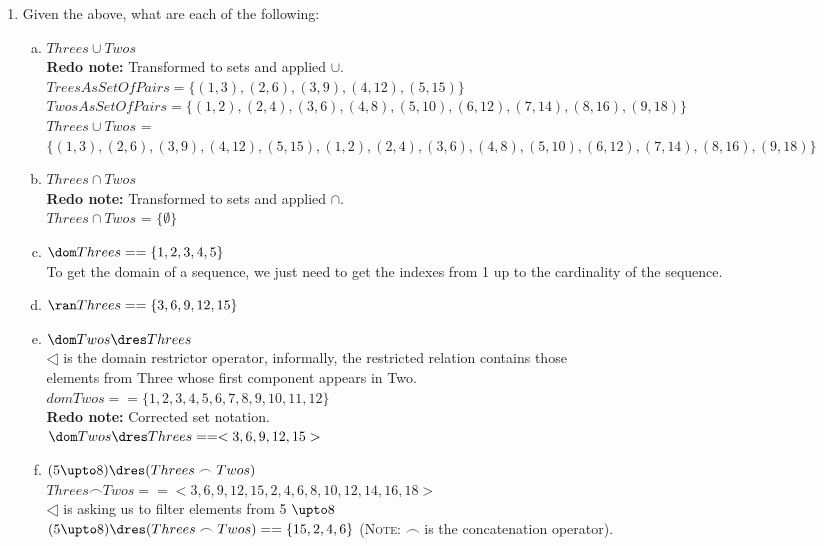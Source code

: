 \documentclass{article}
\begin{document}
\begin{enumerate}[\bf I.]
\begin{enumerate}[1.]
\item Given the above, what are each of the following:
\begin{enumerate}[a.]
\item $Threes \cup Twos$ \\
  \textbf{Redo note:} Transformed to sets and applied $\cup$. \\ 
  $TreesAsSetOfPairs = \{(1,3),(2,6),(3,9),(4,12),(5,15) \} $ \\
  $TwosAsSetOfPairs = \{ (1,2),(2,4),(3,6), (4,8), (5,10),(6,12),(7,14), (8,16), (9,18) \}$ \\
  $Threes \cup Twos$ = $\{(1,3),(2,6),(3,9),(4,12),(5,15),(1,2),(2,4),(3,6),(4,8),(5,10),(6,12),(7,14),(8,16),(9,18) \}$ \\
\item $Threes \cap Twos$ \\
  \textbf{Redo note:} Transformed to sets and applied $\cap$. \\
  $Threes \cap Twos$ = $\{\emptyset\}$ \\
\item $\dom Threes == \{1, 2 ,3 ,4 ,5 \}$ \\
  To get the domain of a sequence, we just need to get the indexes from 1 up to the cardinality of the sequence. \\
\item $\ran Threes == \{3 ,6 ,9 ,12 ,15\}$ \\
\item $\dom Twos \dres Threes$ \\
  $\dres$ is the domain restrictor operator, informally, the restricted relation contains those \\
  elements from Three whose first component appears in Two. \\
  $dom Twos == \{1,2,3,4,5,6,7,8,9,10,11,12\}$\\
  \textbf{Redo note:} Corrected set notation. \\
  $\dom Twos \dres Threes ==<3, 6, 9, 12, 15>$\\
\item $(5 \upto 8)\dres (Threes \frown Twos)$\\
  $Threes \frown Twos == <3,6,9,12,15,2,4,6,8,10,12,14,16,18>$ \\
  $\dres$ is asking us to filter elements from 5 $\upto 8$ \\
  $(5 \upto 8)\dres (Threes \frown Twos) == \{15,2,4,6\}$
(\textsc{Note}: $\frown$ is the concatenation operator).
\end{enumerate}
\end{enumerate}



\end{enumerate}
\end{document}
